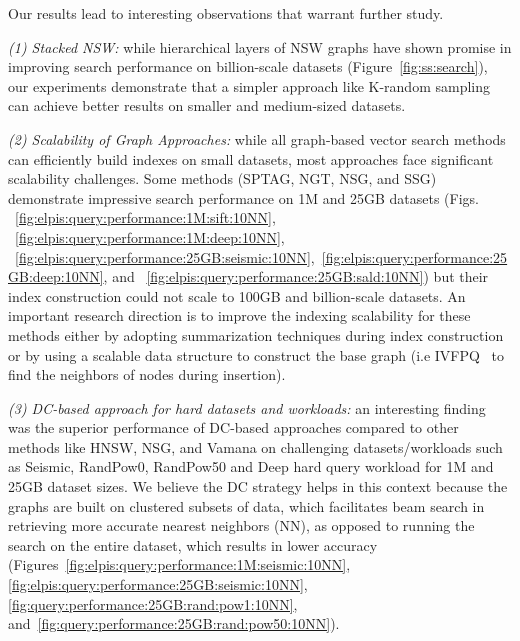  Our results lead to interesting observations that warrant further study. 

\noindent
\textit{(1) Stacked NSW:} while hierarchical layers of NSW graphs have shown promise in improving search performance on billion-scale datasets (Figure~\ref{fig:ss:search}), our experiments demonstrate that a simpler approach like K-random sampling can achieve better results on smaller and medium-sized datasets. 

\noindent
\textit{(2) Scalability of Graph Approaches:} while all graph-based vector search methods can efficiently build indexes on small datasets, most approaches face significant scalability challenges. 
Some methods (SPTAG, NGT, NSG, and SSG) demonstrate
impressive search performance on 1M and 25GB datasets (Figs. ~\ref{fig:elpis:query:performance:1M:sift:10NN}, ~\ref{fig:elpis:query:performance:1M:deep:10NN}, ~\ref{fig:elpis:query:performance:25GB:seismic:10NN},~\ref{fig:elpis:query:performance:25GB:deep:10NN}, and ~\ref{fig:elpis:query:performance:25GB:sald:10NN}) but their index construction could not scale to 100GB and billion-scale datasets. An important research direction is to improve the indexing scalability for these methods either by adopting summarization techniques during index construction or by using a scalable data structure to construct the base graph (i.e IVFPQ~\cite{faiss} to find the neighbors of nodes during insertion). 

\noindent
\textit{(3) DC-based approach for hard datasets and workloads:} an interesting finding was the superior performance of DC-based approaches compared to other methods like HNSW, NSG, and Vamana on challenging datasets/workloads such as Seismic, RandPow0, RandPow50 and Deep hard query workload for 1M and 25GB dataset sizes. We believe the DC strategy helps in this context because the graphs are built on clustered subsets of data, which facilitates beam search in retrieving more accurate nearest neighbors (NN), as opposed to running the search on the entire dataset, which results in lower accuracy (Figures~\ref{fig:elpis:query:performance:1M:seismic:10NN}, \ref{fig:elpis:query:performance:25GB:seismic:10NN}, \ref{fig:query:performance:25GB:rand:pow1:10NN}, and~\ref{fig:query:performance:25GB:rand:pow50:10NN}).
\karima{The optimized implementations from~\cite{parlayann} exhibit faster query times during search, but the gap narrows down with high recall. 
}

